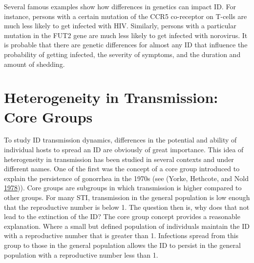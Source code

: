 \documentclass[]{book}
\theoremstyle{definition}
\theoremstyle{definition}
\theoremstyle{definition}
\theoremstyle{remark}
\begin{document}
Several famous examples show how differences in genetics can impact ID.
For instance, persons with a certain mutation of the CCR5 co-receptor on
T-cells are much less likely to get infected with HIV. Similarly,
persons with a particular mutation in the FUT2 gene are much less likely
to get infected with norovirus. It is probable that there are genetic
differences for almost any ID that influence the probability of getting
infected, the severity of symptoms, and the duration and amount of
shedding.

\section{Heterogeneity in Transmission: Core
Groups}\label{heterogeneity-in-transmission-core-groups}

To study ID transmission dynamics, differences in the potential and
ability of individual hosts to spread an ID are obviously of great
importance. This idea of heterogeneity in transmission has been studied
in several contexts and under different names. One of the first was the
concept of a core group introduced to explain the persistence of
gonorrhea in the 1970s (see (Yorke, Hethcote, and Nold
\protect\hyperlink{ref-yorke78}{1978})). Core groups are subgroups in
which transmission is higher compared to other groups. For many STI,
transmission in the general population is low enough that the
reproductive number is below 1. The question then is, why does that not
lead to the extinction of the ID? The core group concept provides a
reasonable explanation. Where a small but defined population of
individuals maintain the ID with a reproductive number that is greater
than 1. Infections spread from this group to those in the general
population allows the ID to persist in the general population with a
reproductive number less than 1.
\end{document}
